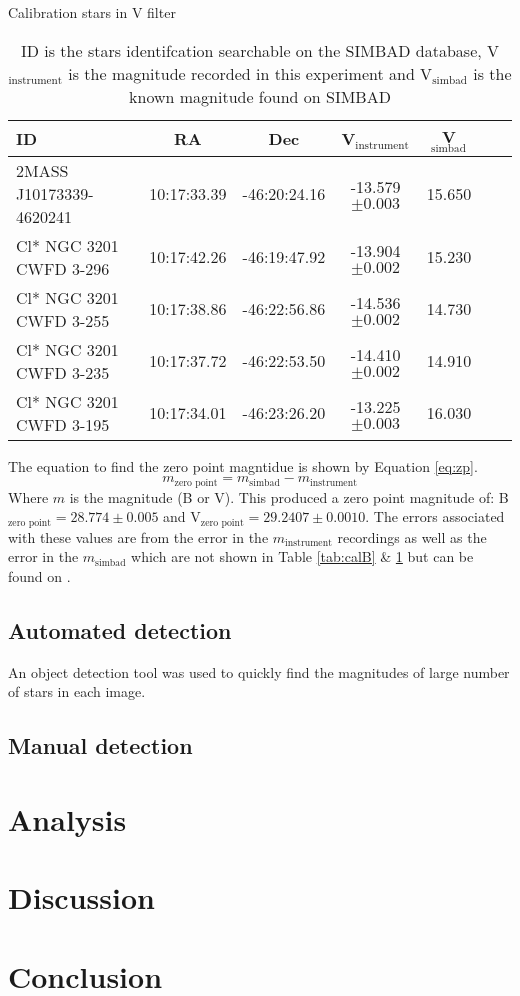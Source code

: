\documentclass[11pt]{article}
\begin{document}
\begin{table}[h]
\centering
\caption{Calibration stars in V filter}
\begin{tabular}{lcccccc}
\toprule
ID & RA & Dec & V$_{\text{instrument}}$ & V$_{\text{simbad}}$\\
\midrule
2MASS J10173339-4620241 & 10:17:33.39 & -46:20:24.16 & -13.579$\pm 0.003$ & 15.650 \\                   
Cl* NGC 3201 CWFD 3-296 & 10:17:42.26 & -46:19:47.92 & -13.904$\pm 0.002$ & 15.230 \\                  
Cl* NGC 3201 CWFD 3-255 & 10:17:38.86 & -46:22:56.86 & -14.536$\pm 0.002$ & 14.730 \\                  
Cl* NGC 3201 CWFD 3-235 & 10:17:37.72 & -46:22:53.50 & -14.410$\pm 0.002$ & 14.910 \\                     
Cl* NGC 3201 CWFD 3-195 & 10:17:34.01 & -46:23:26.20 & -13.225$\pm 0.003$ & 16.030\\ 
\bottomrule
\end{tabular}
\caption*{ID is the stars identifcation searchable on the SIMBAD database, V$_{\text{instrument}}$ is the magnitude recorded in this experiment and V$_{\text{simbad}}$ is the known magnitude found on SIMBAD \citep{simbad}}
\label{tab:calV}
\end{table}

The equation to find the zero point magntidue is shown by Equation \ref{eq:zp}.
\begin{equation}
	m_{\text{zero point}} = m_{\text{simbad}} - m_{\text{instrument}}
	\label{eq:zp}
\end{equation}
Where $m$ is the magnitude (B or V). This produced a zero point magnitude of: B$_{\text{zero point}} = 28.774 \pm 0.005$ and V$_{\text{zero point}} = 29.2407 \pm 0.0010$. The errors associated with these values are from the error in the $m_{\text{instrument}}$ recordings as well as the error in the $m_{\text{simbad}}$ which are not shown in Table \ref{tab:calB} \& \ref{tab:calV} but can be found on \citet{simbad}. 

\subsection{Automated detection}

An object detection tool was used to quickly find the magnitudes of large number of stars in each image. 

\subsection{Manual detection}

\section{Analysis}

\section{Discussion}

\section{Conclusion}



\end{document}
